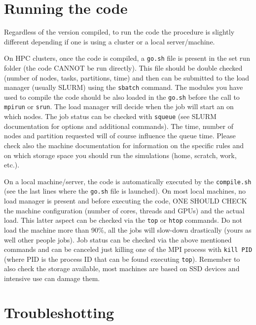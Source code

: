 \section{Running the code}

Regardless of the version compiled, to run the code the procedure is slightly different depending if one is using a cluster or a local server/machine.

On HPC clusters, once the code is compiled, a \texttt{go.sh} file is present in the set run folder (the code CANNOT be run directly).
This file should be double checked (number of nodes, tasks, partitions, time) and then can be submitted to the load manager (usually SLURM) using the \texttt{sbatch} command.
The modules you have used to compile the code should be also loaded in the \texttt{go.sh} before the call to \texttt{mpirun} or \texttt{srun}.
The load manager will decide when the job will start an on which nodes.
The job status can be checked with \texttt{squeue} (see SLURM documentation for options and additional commands).
The time, number of nodes and partition requested will of course influence the queue time.
Please check also the machine documentation for information on the specific rules and on which storage space you should run the simulations (home, scratch, work, etc.).

On a local machine/server, the code is automatically executed by the \texttt{compile.sh} (see the last lines where the \texttt{go.sh} file is launched).
On most local machines, no load manager is present and before executing the code, ONE SHOULD CHECK the machine configuration (number of cores, threads and GPUs) and the actual load.
This latter aspect can be checked via the \texttt{top} or \texttt{htop} commands.
Do not load the machine more than 90\%, all the jobs will slow-down drastically (yours as well other people jobs).
Job status can be checked via the above mentioned commands and can be canceled just killing one of the MPI process with \texttt{kill PID} (where PID is the process ID that can be found executing \texttt{top}).
Remember to also check the storage available, most machines are based on SSD devices and intensive use can damage them.




\section{Troubleshotting}

